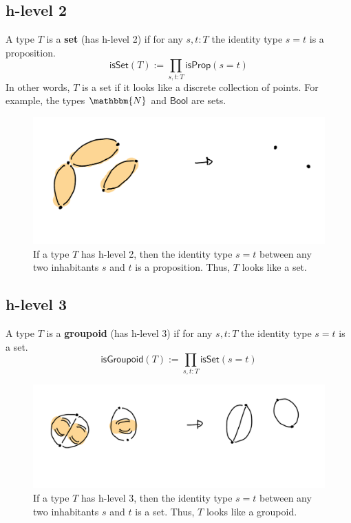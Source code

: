 \documentclass{amsart}
\theoremstyle{definition}
\newcommand{\N}{\mathbbm{N}}
\newcommand{\Bool}{\ensuremath{\mathsf{Bool}}}
\newcommand{\isProp}{\ensuremath{\mathsf{isProp}}}
\newcommand{\isSet}{\ensuremath{\mathsf{isSet}}}
\newcommand{\isGroupoid}{\ensuremath{\mathsf{isGroupoid}}}
\renewcommand{\emph}{\textbf}
\begin{document}
\subsection{h-level 2}\label{sec:h-level-2}
A type $T$ is a \emph{set} (has h-level 2) if for any $s, t : T$ the identity type $s = t$ is a proposition.
\[
    \isSet(T) := \prod_{s,t : T}\isProp(s = t)
\]
In other words, $T$ is a set if it looks like a discrete collection of points.
For example, the types $\N$ and $\Bool$ are sets.
\begin{figure}[h]
    \centering
    \includegraphics[scale=0.5]{hlvl2.png}
    \caption{If a type $T$ has h-level 2, then the identity type $s = t$ between any two inhabitants $s$ and $t$ is a proposition.
    Thus, $T$ looks like a set.}
    \label{fig:h-level-2}
\end{figure}

\subsection{h-level 3}\label{sec:h-level-3}
A type $T$ is a \emph{groupoid} (has h-level 3) if for any $s, t : T$ the identity type $s = t$ is a set.
\[
    \isGroupoid(T) := \prod_{s, t : T}\isSet(s = t)
\]
\begin{figure}[h]
    \centering
    \includegraphics[scale=0.5]{hlvl3.png}
    \caption{If a type $T$ has h-level 3, then the identity type $s = t$ between any two inhabitants $s$ and $t$ is a set.
    Thus, $T$ looks like a groupoid.}
    \label{fig:h-level-3}
\end{figure}
\end{document}
